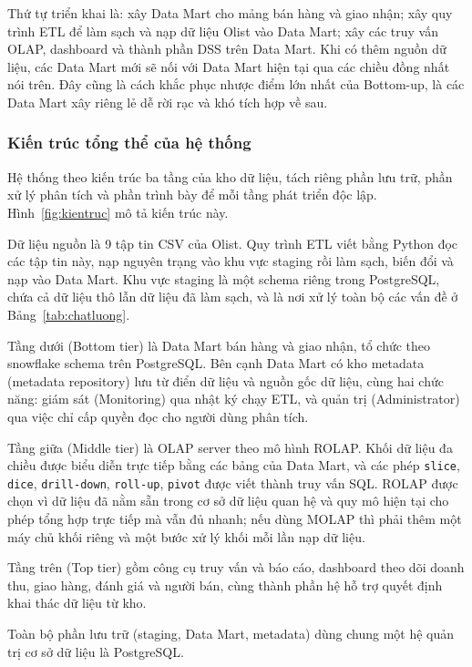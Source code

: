 Thứ tự triển khai là: xây Data Mart cho mảng bán hàng và giao nhận; xây quy trình ETL để làm sạch và nạp dữ liệu Olist vào Data Mart; xây các truy vấn OLAP, dashboard và thành phần DSS trên Data Mart. Khi có thêm nguồn dữ liệu, các Data Mart mới sẽ nối với Data Mart hiện tại qua các chiều đồng nhất nói trên. Đây cũng là cách khắc phục nhược điểm lớn nhất của Bottom-up, là các Data Mart xây riêng lẻ dễ rời rạc và khó tích hợp về sau.

\subsubsection{Kiến trúc tổng thể của hệ thống}\label{sec:kientruc}

Hệ thống theo kiến trúc ba tầng của kho dữ liệu, tách riêng phần lưu trữ, phần xử lý phân tích và phần trình bày để mỗi tầng phát triển độc lập. Hình~\ref{fig:kientruc} mô tả kiến trúc này.



Dữ liệu nguồn là 9 tập tin CSV của Olist. Quy trình ETL viết bằng Python đọc các tập tin này, nạp nguyên trạng vào khu vực staging rồi làm sạch, biến đổi và nạp vào Data Mart. Khu vực staging là một schema riêng trong PostgreSQL, chứa cả dữ liệu thô lẫn dữ liệu đã làm sạch, và là nơi xử lý toàn bộ các vấn đề ở Bảng~\ref{tab:chatluong}.

Tầng dưới (Bottom tier) là Data Mart bán hàng và giao nhận, tổ chức theo snowflake schema trên PostgreSQL. Bên cạnh Data Mart có kho metadata (metadata repository) lưu từ điển dữ liệu và nguồn gốc dữ liệu, cùng hai chức năng: giám sát (Monitoring) qua nhật ký chạy ETL, và quản trị (Administrator) qua việc chỉ cấp quyền đọc cho người dùng phân tích.

Tầng giữa (Middle tier) là OLAP server theo mô hình ROLAP. Khối dữ liệu đa chiều được biểu diễn trực tiếp bằng các bảng của Data Mart, và các phép \texttt{slice}, \texttt{dice}, \texttt{drill-down}, \texttt{roll-up}, \texttt{pivot} được viết thành truy vấn SQL. ROLAP được chọn vì dữ liệu đã nằm sẵn trong cơ sở dữ liệu quan hệ và quy mô hiện tại cho phép tổng hợp trực tiếp mà vẫn đủ nhanh; nếu dùng MOLAP thì phải thêm một máy chủ khối riêng và một bước xử lý khối mỗi lần nạp dữ liệu.

Tầng trên (Top tier) gồm công cụ truy vấn và báo cáo, dashboard theo dõi doanh thu, giao hàng, đánh giá và người bán, cùng thành phần hệ hỗ trợ quyết định khai thác dữ liệu từ kho.

Toàn bộ phần lưu trữ (staging, Data Mart, metadata) dùng chung một hệ quản trị cơ sở dữ liệu là PostgreSQL. 